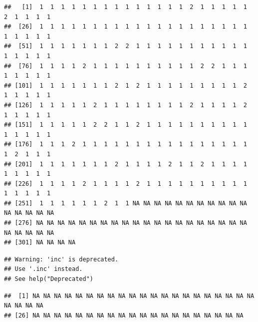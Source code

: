\documentclass[
]{book}
\newenvironment{Shaded}{\begin{snugshade}}{\end{snugshade}}
\newcommand{\CommentTok}[1]{\textcolor[rgb]{0.56,0.35,0.01}{\textit{#1}}}
\newcommand{\FunctionTok}[1]{\textcolor[rgb]{0.13,0.29,0.53}{\textbf{#1}}}
\newcommand{\NormalTok}[1]{#1}
\newcommand{\SpecialCharTok}[1]{\textcolor[rgb]{0.81,0.36,0.00}{\textbf{#1}}}
\newcommand{\StringTok}[1]{\textcolor[rgb]{0.31,0.60,0.02}{#1}}
\begin{document}
\begin{Shaded}
\end{Shaded}

\begin{verbatim}
##   [1]  1  1  1  1  1  1  1  1  1  1  1  1  1  1  2  1  1  1  1  1  2  1  1  1  1
##  [26]  1  1  1  1  1  1  1  1  1  1  1  1  1  1  1  1  1  1  1  1  1  1  1  1  1
##  [51]  1  1  1  1  1  1  1  2  2  1  1  1  1  1  1  1  1  1  1  1  1  1  1  1  1
##  [76]  1  1  1  1  2  1  1  1  1  1  1  1  1  1  1  2  2  1  1  1  1  1  1  1  1
## [101]  1  1  1  1  1  1  1  2  1  2  1  1  1  1  1  1  1  1  1  2  1  1  1  1  1
## [126]  1  1  1  1  1  2  1  1  1  1  1  1  1  1  2  1  1  1  1  2  1  1  1  1  1
## [151]  1  1  1  1  1  2  2  1  1  2  1  1  1  1  1  1  1  1  1  1  1  1  1  1  1
## [176]  1  1  1  2  1  1  1  1  1  1  1  1  1  1  1  1  1  1  1  1  1  2  1  1  1
## [201]  1  1  1  1  1  1  1  2  1  1  1  1  2  1  1  2  1  1  1  1  1  1  1  1  1
## [226]  1  1  1  1  2  1  1  1  1  2  1  1  1  1  1  1  1  1  1  1  1  1  1  1  1
## [251]  1  1  1  1  1  1  2  1  1 NA NA NA NA NA NA NA NA NA NA NA NA NA NA NA NA
## [276] NA NA NA NA NA NA NA NA NA NA NA NA NA NA NA NA NA NA NA NA NA NA NA NA NA
## [301] NA NA NA NA
\end{verbatim}

\begin{Shaded}
\end{Shaded}

\begin{verbatim}
## Warning: 'inc' is deprecated.
## Use '.inc' instead.
## See help("Deprecated")
\end{verbatim}

\begin{verbatim}
##  [1] NA NA NA NA NA NA NA NA NA NA NA NA NA NA NA NA NA NA NA NA NA NA NA NA NA
## [26] NA NA NA NA NA NA NA NA NA NA NA NA NA NA NA NA NA NA NA NA
\end{verbatim}
\end{document}

